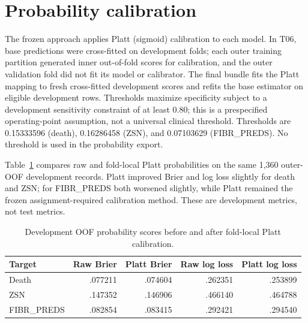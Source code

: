 \section{Probability calibration}
The frozen approach applies Platt (sigmoid) calibration to each model. In T06, base predictions were cross-fitted on development folds; each outer training partition generated inner out-of-fold scores for calibration, and the outer validation fold did not fit its model or calibrator. The final bundle fits the Platt mapping to fresh cross-fitted development scores and refits the base estimator on eligible development rows. Thresholds maximize specificity subject to a development sensitivity constraint of at least 0.80; this is a prespecified operating-point assumption, not a universal clinical threshold. Thresholds are 0.15333596 (death), 0.16286458 (ZSN), and 0.07103629 (FIBR\_PREDS). No threshold is used in the probability export.

Table~\ref{tab:development-cal} compares raw and fold-local Platt probabilities on the same 1,360 outer-OOF development records. Platt improved Brier and log loss slightly for death and ZSN; for FIBR\_PREDS both worsened slightly, while Platt remained the frozen assignment-required calibration method. These are development metrics, not test metrics.
\begin{table}[H]\centering\small
\caption{Development OOF probability scores before and after fold-local Platt calibration.}\label{tab:development-cal}
\begin{tabular}{lrrrr}\toprule
Target & Raw Brier & Platt Brier & Raw log loss & Platt log loss\\\midrule
Death & .077211 & .074604 & .262351 & .253899\\
ZSN & .147352 & .146906 & .466140 & .464788\\
FIBR\_PREDS & .082854 & .083415 & .292421 & .294540\\\bottomrule
\end{tabular}\end{table}

